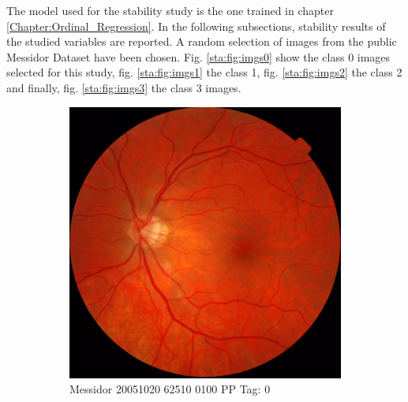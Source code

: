 The model used for the stability study is the one trained in chapter \ref{Chapter:Ordinal_Regression}. In the following subsections, stability results of the studied variables are reported. A random selection of images from the public Messidor Dataset \citep{decenciere_feedback_2014} have been chosen. Fig. \ref{sta:fig:imgs0} show the class 0 images selected for this study, fig. \ref{sta:fig:imgs1} the class 1, fig. \ref{sta:fig:imgs2} the class 2 and finally, fig. \ref{sta:fig:imgs3} the class 3 images. 

\begin{figure}[ht!]
	\centering
	\begin{subfigure}[b]{0.4\textwidth}
		\centering
		\includegraphics[width=\textwidth]{Figures/chapter_stability/20051020_62510_0100_PP/20051020_62510_0100_PP.jpeg}
		\caption{Messidor 20051020 62510 0100 PP Tag: 0}
	\end{subfigure} ~
	\begin{subfigure}[b]{0.4\textwidth}
		\centering

\end{subfigure}
\end{figure}
